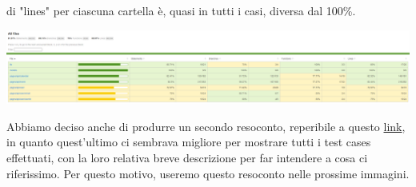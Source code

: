 di "lines" per ciascuna cartella è, quasi in tutti i casi, diversa dal 100\%.

\begin{center}
        \includegraphics[width=1\textwidth, height=0.1\textheight]{img/png/tests/test_totale_1.png}
\end{center}

Abbiamo deciso anche di produrre un secondo resoconto, reperibile a questo \href{https://plan-it.it/test-report.html} {link}, in quanto quest'ultimo ci sembrava migliore per mostrare tutti i test cases effettuati, con la loro relativa breve descrizione per far intendere a cosa ci riferissimo. Per questo motivo, useremo questo resoconto nelle prossime immagini.


